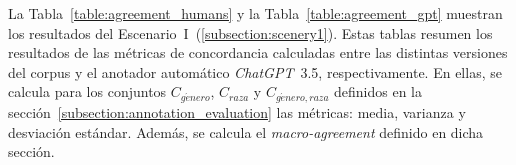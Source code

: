 La Tabla~\ref{table:agreement_humans} y la Tabla~\ref{table:agreement_gpt} muestran los resultados del 
Escenario~I~(\ref{subsection:scenery1}).
Estas tablas resumen los resultados de las m\'etricas de concordancia calculadas entre las distintas
versiones del corpus y el anotador autom\'atico \emph{ChatGPT}~3.5, respectivamente. En ellas, se 
calcula para los conjuntos $C_{g\acute{e}nero}$, $C_{raza}$ y $C_{g\acute{e}nero, raza}$ definidos
en la secci\'on~\ref{subsection:annotation_evaluation} las m\'etricas: media, varianza y desviaci\'on
est\'andar. Adem\'as, se calcula el \emph{macro-agreement} definido en dicha secci\'on.

\begin{table}[htpb]
    \centering
    \caption{Resumen de m\'etricas de concordancia entre las distintas versiones del corpus.}
    \label{table:agreement_humans}
\end{table}


